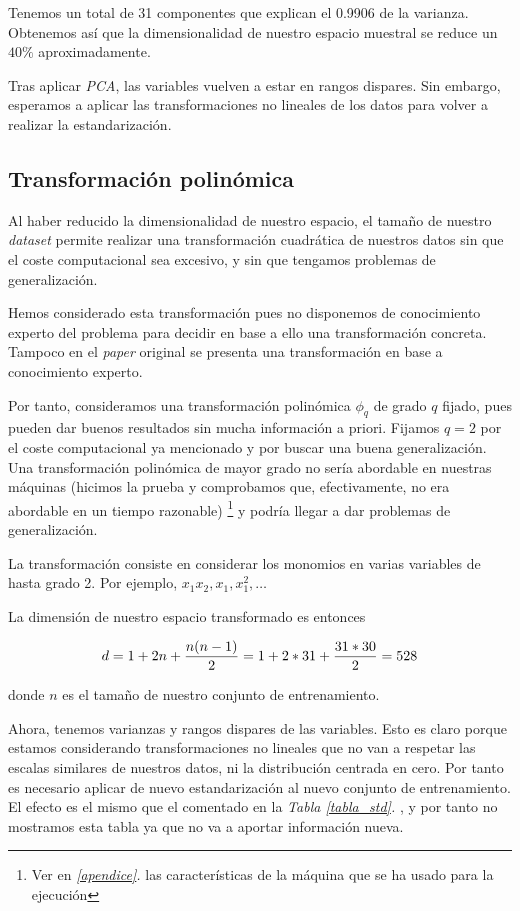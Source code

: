 \documentclass[11pt]{article}
\begin{document}
Tenemos un total de 31 componentes que explican el 0.9906 de la varianza. Obtenemos así que la dimensionalidad de nuestro espacio muestral se reduce un $40\%$ aproximadamente.

Tras aplicar \emph{PCA}, las variables vuelven a estar en rangos dispares. Sin embargo, esperamos a aplicar las transformaciones no lineales de los datos para volver a realizar la estandarización.

\subsection{Transformación polinómica}

Al haber reducido la dimensionalidad de nuestro espacio, el tamaño de nuestro \emph{dataset} permite realizar una transformación cuadrática de nuestros datos sin que el coste computacional sea excesivo, y sin que tengamos problemas de generalización.

Hemos considerado esta transformación pues no disponemos de conocimiento experto del problema para decidir en base a ello una transformación concreta. Tampoco en el \emph{paper} original \cite{original_paper:paper} se presenta una transformación en base a conocimiento experto.

Por tanto, consideramos una transformación polinómica $\phi_q$ de grado $q$ fijado, pues pueden dar buenos resultados sin mucha información a priori. Fijamos $q=2$ por el coste computacional ya mencionado y por buscar una buena generalización. Una transformación polinómica de mayor grado no sería abordable en nuestras máquinas (hicimos la prueba y comprobamos que, efectivamente, no era abordable en un tiempo razonable) \footnote{Ver en \emph{\ref{apendice}. } las características de la máquina que se ha usado para la ejecución} y podría llegar a dar problemas de generalización.

La transformación consiste en considerar los monomios en varias variables de hasta grado 2. Por ejemplo, $x_1 x_2, x_1, x_1^2, \ldots$

La dimensión de nuestro espacio transformado es entonces

$$d = {1+2n}+{{n(n-1)}\over{2}} = {1+2*31}+{{31*30}\over{2}} = 528$$

donde $n$ es el tamaño de nuestro conjunto de entrenamiento.

Ahora, tenemos varianzas y rangos dispares de las variables. Esto es claro porque estamos considerando transformaciones no lineales que no van a respetar las escalas similares de nuestros datos, ni la distribución centrada en cero. Por tanto es necesario aplicar de nuevo estandarización al nuevo conjunto de entrenamiento. El efecto es el mismo que el comentado en la \emph{Tabla \ref{tabla_std}. }, y por tanto no mostramos esta tabla ya que no va a aportar información nueva.
\end{document}
